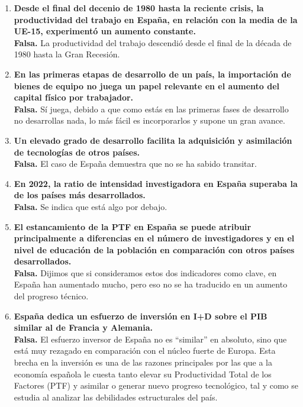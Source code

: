 \begin{enumerate}[label=\arabic*., resume=preguntas]
    \item \textbf{Desde el final del decenio de 1980 hasta la reciente crisis, la productividad del trabajo en España, en relación con la media de la UE-15, experimentó un aumento constante.} \\
    \textbf{Falsa.} La productividad del trabajo descendió desde el final de la década de 1980 hasta la Gran Recesión.

    \item \textbf{En las primeras etapas de desarrollo de un país, la importación de bienes de equipo no juega un papel relevante en el aumento del capital físico por trabajador.} \\
    \textbf{Falsa.} Sí juega, debido a que como estás en las primeras fases de desarrollo no desarrollas nada, lo más fácil es incorporarlos y supone un gran avance.

    \item \textbf{Un elevado grado de desarrollo facilita la adquisición y asimilación de tecnologías de otros países.} \\
    \textbf{Falsa.} El caso de España demuestra que no se ha sabido transitar.

    \item \textbf{En 2022, la ratio de intensidad investigadora en España superaba la de los países más desarrollados.} \\
    \textbf{Falsa.} Se indica que está algo por debajo.

    \item \textbf{El estancamiento de la PTF en España se puede atribuir principalmente a diferencias en el número de investigadores y en el nivel de educación de la población en comparación con otros países desarrollados.} \\
    \textbf{Falsa.} Dijimos que si consideramos estos dos indicadores como clave, en España han aumentado mucho, pero eso no se ha traducido en un aumento del progreso técnico.

    \item \textbf{España dedica un esfuerzo de inversión en I+D sobre el PIB similar al de Francia y Alemania.} \\
    \textbf{Falsa.} El esfuerzo inversor de España no es ``similar'' en absoluto, sino que está muy rezagado en comparación con el núcleo fuerte de Europa. Esta brecha en la inversión es una de las razones principales por las que a la economía española le cuesta tanto elevar su Productividad Total de los Factores (PTF) y asimilar o generar nuevo progreso tecnológico, tal y como se estudia al analizar las debilidades estructurales del país.

\end{enumerate}

